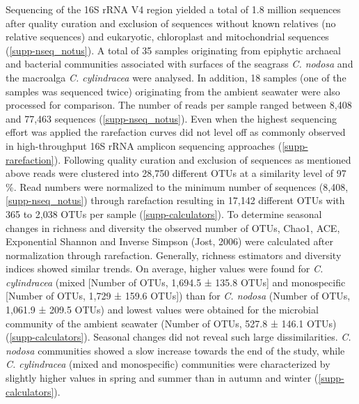 \documentclass[12pt,]{article}
\begin{document}
Sequencing of the 16S rRNA V4 region yielded a total of 1.8 million
sequences after quality curation and exclusion of sequences without
known relatives (no relative sequences) and eukaryotic, chloroplast and
mitochondrial sequences (\autoref{supp-nseq_notus}). A total of 35
samples originating from epiphytic archaeal and bacterial communities
associated with surfaces of the seagrass \emph{C. nodosa} and the
macroalga \emph{C. cylindracea} were analysed. In addition, 18 samples
(one of the samples was sequenced twice) originating from the ambient
seawater were also processed for comparison. The number of reads per
sample ranged between 8,408 and 77,463 sequences
(\autoref{supp-nseq_notus}). Even when the highest sequencing effort was
applied the rarefaction curves did not level off as commonly observed in
high-throughput 16S rRNA amplicon sequencing approaches
(\autoref{supp-rarefaction}). Following quality curation and exclusion
of sequences as mentioned above reads were clustered into 28,750
different OTUs at a similarity level of 97 \si{\percent}. Read numbers
were normalized to the minimum number of sequences (8,408,
\autoref{supp-nseq_notus}) through rarefaction resulting in 17,142
different OTUs with 365 to 2,038 OTUs per sample
(\autoref{supp-calculators}). To determine seasonal changes in richness
and diversity the observed number of OTUs, Chao1, ACE, Exponential
Shannon and Inverse Simpson (Jost, 2006) were calculated after
normalization through rarefaction. Generally, richness estimators and
diversity indices showed similar trends. On average, higher values were
found for \emph{C. cylindracea} (mixed {[}Number of OTUs, 1,694.5 ±
135.8 OTUs{]} and monospecific {[}Number of OTUs, 1,729 ± 159.6 OTUs{]})
than for \emph{C. nodosa} (Number of OTUs, 1,061.9 ± 209.5 OTUs) and
lowest values were obtained for the microbial community of the ambient
seawater (Number of OTUs, 527.8 ± 146.1 OTUs)
(\autoref{supp-calculators}). Seasonal changes did not reveal such large
dissimilarities. \emph{C. nodosa} communities showed a slow increase
towards the end of the study, while \emph{C. cylindracea} (mixed and
monospecific) communities were characterized by slightly higher values
in spring and summer than in autumn and winter
(\autoref{supp-calculators}).
\end{document}

